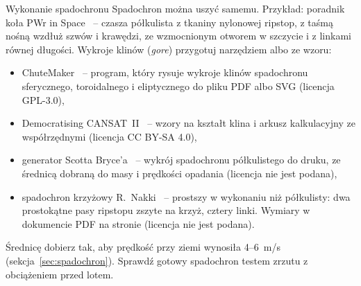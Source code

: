 \begin{podsekcja}{Wykonanie spadochronu}
Spadochron można uszyć samemu. Przykład: poradnik koła PWr in Space~\cite{ripstopdiy} -- czasza półkulista z tkaniny nylonowej ripstop, z taśmą nośną wzdłuż szwów i krawędzi, ze wzmocnionym otworem w szczycie i z linkami równej długości. Wykroje klinów (\emph{gore}) przygotuj narzędziem albo ze wzoru:
\begin{itemize}
  \item ChuteMaker~\cite{chutemaker} -- program, który rysuje wykroje klinów spadochronu sferycznego, toroidalnego i eliptycznego do pliku PDF albo SVG (licencja GPL-3.0),
  \item Democratising CANSAT~II~\cite{cansatgores} -- wzory na kształt klina i arkusz kalkulacyjny ze współrzędnymi (licencja CC BY-SA 4.0),
  \item generator Scotta Bryce'a~\cite{bryceparachute} -- wykrój spadochronu półkulistego do druku, ze średnicą dobraną do masy i prędkości opadania (licencja nie jest podana),
  \item spadochron krzyżowy R.~Nakki~\cite{nakkaxchute} -- prostszy w wykonaniu niż półkulisty: dwa prostokątne pasy ripstopu zszyte na krzyż, cztery linki. Wymiary w dokumencie PDF na stronie (licencja nie jest podana).
\end{itemize}
Średnicę dobierz tak, aby prędkość przy ziemi wynosiła 4--\SI{6}{m/s} (sekcja~\ref{sec:spadochron}). Sprawdź gotowy spadochron testem zrzutu z obciążeniem przed lotem.
\end{podsekcja}

